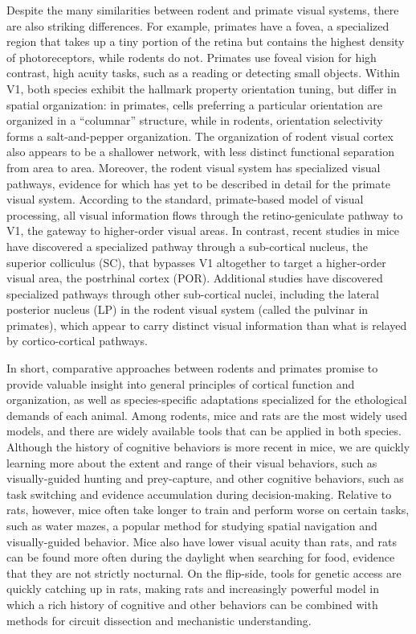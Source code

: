 Despite the many similarities between rodent and primate visual systems, there are also striking differences. For example, primates have a fovea, a specialized region that takes up a tiny portion of the retina but contains the highest density of photoreceptors\cite{Perry1985}, while rodents do not. Primates use foveal vision for high contrast, high acuity tasks, such as a reading or detecting small objects. Within V1, both species exhibit the hallmark property orientation tuning, but differ in spatial organization: in primates, cells preferring a particular orientation are organized in a ``columnar'' structure, while in rodents, orientation selectivity forms a salt-and-pepper organization\cite{Ohki2005}. The organization of rodent visual cortex also appears to be a shallower network, with less distinct functional separation from area to area\cite{Oh2014,Gamanut2018,DSouza2020}. Moreover, the rodent visual system has specialized visual pathways, evidence for which has yet to be described in detail for the primate visual system. According to the standard, primate-based model of visual processing, all visual information flows through the retino-geniculate pathway to V1, the gateway to higher-order visual areas. In contrast, recent studies in mice have discovered a specialized pathway through a sub-cortical nucleus, the superior colliculus (SC), that bypasses V1 altogether to target a higher-order visual area, the postrhinal cortex (POR)\cite{Beltramo2019}. Additional studies have discovered specialized pathways through other sub-cortical nuclei, including the lateral posterior nucleus (LP) in the rodent visual system (called the pulvinar in primates), which appear to carry distinct visual information than what is relayed by cortico-cortical pathways\cite{Bennett2019,Blot2021}.


In short, comparative approaches between rodents and primates promise to provide valuable insight into general principles of cortical function and organization, as well as species-specific adaptations specialized for the ethological demands of each animal. Among rodents, mice and rats are the most widely used models, and there are widely available tools that can be applied in both species. Although the history of cognitive behaviors is more recent in mice, we are quickly learning more about the extent and range of their visual behaviors, such as visually-guided hunting and prey-capture\cite{Hoy2016, Meyer2020, Michaiel2020}, and other cognitive behaviors, such as task switching\cite{Lee2020} and evidence accumulation during decision-making\cite{Pinto2018}. Relative to rats, however, mice often take longer to train and perform worse on certain tasks, such as water mazes, a popular method for studying spatial navigation and visually-guided behavior\cite{Whishaw1995, Whishaw1996,Colacicco2002,Jaramillo2014}. Mice also have lower visual acuity than rats\cite{Prusky2000}, and rats can be found more often during the daylight when searching for food, evidence that they are not strictly nocturnal. On the flip-side, tools for genetic access are quickly catching up in rats, making rats and increasingly powerful model in which a rich history of cognitive and other behaviors can be combined with methods for circuit dissection and mechanistic understanding. 

